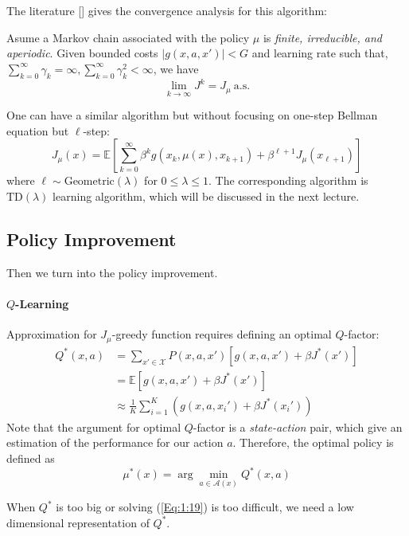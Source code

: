 The literature [\cite{Sutton1988}] gives the convergence analysis for this algorithm:
\begin{theorem}
Asume a Markov chain associated with the policy $\mu$ is \emph{finite, irreducible, and aperiodic}.
Given bounded costs $|g(x,a,x')|<G$ and learning rate such that, $\sum_{k=0}^\infty\gamma_k=\infty,\sum_{k=0}^\infty\gamma_k^2<\infty$, we have
\[
\lim_{k\to\infty}J^k=J_\mu \ \text{a.s.}
\]
\end{theorem}
\begin{remark}
One can have a similar algorithm but without focusing on one-step Bellman equation but $\ell$-step:
\[
J_\mu(x)=\mathbb{E}\left[\sum_{k=0}^\infty\beta^k g(x_k,\mu(x),x_{k+1})+\beta^{\ell+1}J_\mu(x_{\ell+1})\right]
\]
where $\ell\sim\text{Geometric}(\lambda)$ for $0\le\lambda\le1$. The corresponding algorithm is $\text{TD}(\lambda)$ learning algorithm, which will be discussed in the next lecture.
\end{remark}

\subsection{Policy Improvement}
Then we turn into the policy improvement. 
\paragraph{$Q$-Learning}
Approximation for $J_\mu$-greedy function requires defining an optimal $Q$-factor:
\begin{equation}\label{Eq:1:18}
\begin{aligned}
Q^*(x,a)&=\sum_{x'\in\mathcal{X}}P(x,a,x')\left[g(x,a,x')+\beta J^*(x')\right]\\
&=\mathbb{E}[g(x,a,x')+\beta J^*(x')]\\
&\approx\frac{1}{K}\sum_{i=1}^K\left(g(x,a,x_i')+\beta J^*(x_i')\right)
\end{aligned}
\end{equation}
Note that the argument for optimal $Q$-factor is a \emph{state-action} pair, which give an estimation of the performance for our action $a$. Therefore, the optimal policy is defined as
\begin{equation}\label{Eq:1:19}
\mu^*(x)=\arg\min_{a\in\mathcal{A}(x)}Q^*(x,a)
\end{equation}
\begin{remark}
When $Q^*$ is too big or solving (\ref{Eq:1:19}) is too difficult, we need a low dimensional representation of $Q^*$.
\end{remark}

